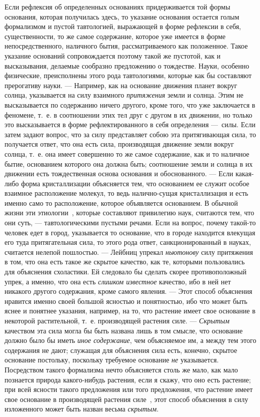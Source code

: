 Если рефлексия об определенных основаниях придерживается той формы
основания, которая получилась здесь, то указание основания остается голым
формализмом и пустой тавтологией, выражающей в форме рефлексии в себя,
существенности, то же самое содержание, которое уже имеется в форме
непосредственного, наличного бытия, рассматриваемого как положенное. Такое
указание оснований сопровождается поэтому такой же пустотой, как и
высказывания, делаемые сообразно предложению о тождестве. Науки, особенно
физические, преисполнены этого рода тавтологиями, которые как бы составляют
прерогативу науки. — Например, как на основание движения планет вокруг
солнца, указывается на силу взаимного {\em притяжения}
земли и солнца. Этим не высказывается по содержанию ничего другого, кроме
того, что уже заключается в феномене, т.~е. в соотношении этих тел друг с
другом в их движении, но только это высказывается в форме рефлектированного
в себя определения —~силы. Если затем задают вопрос, что за силу
представляет собою эта притягивающая сила, то получается ответ, что она
есть сила, производящая движение земли вокруг солнца, т.~е. она имеет
совершенно то же самое содержание, как и то наличное бытие, основанием
которого она должна быть; соотношение земли и солнца в их движении есть
тождественная основа основания и обоснованного. — Если какая-либо форма
кристаллизации объясняется тем, что основанием ее служит особое взаимное
расположение молекул, то ведь налично-сущая кристаллизация и есть именно
само то расположение, которое объявляется основанием. В обычной жизни эти
этиологии~\label{bkm:Ref474666904},
которые составляют привилегию наук, считаются тем, что они суть, —
тавтологическими пустыми речами. Если на вопрос, почему такой-то человек
едет в город, указывается то основание, что в городе находится влекущая его
туда притягательная сила, то этого рода ответ, санкционированный в науках,
считается нелепой пошлостью. — Лейбниц упрекал
{\em ньютонову} силу притяжения в том, что она есть
такое же скрытое качество, как те, которыми пользовались для объяснения
схоластики. Ей следовало бы сделать скорее противоположный упрек, а именно,
что она есть {\em слишком известное} качество, ибо в
ней нет никакого другого содержания, кроме самого явления. — Этот способ
объяснения нравится именно своей большой ясностью и понятностью, ибо что
может быть яснее и понятнее указания, например, на то, что растение имеет
свое основание в некоторой растительной, т.~е. производящей растения силе.
— {\em Скрытым} качеством эта сила могла бы быть
названа лишь в том смысле, что основание должно было бы иметь
{\em иное содержание}, чем объясняемое им, а между тем
этого содержания не дают; служащая для объяснения сила есть, конечно,
скрытое основание постольку, поскольку требуемое основание
{\em не} указывается. Посредством такого формализма
нечто объясняется столь же мало, как мало познается природа какого-нибудь
растения, если я скажу, что оно есть растение; при всей ясности такого
предложения или того предложения, что растение имеет свое основание в
производящей растения
силе~\label{bkm:Ref474666911},
этот способ объяснения в силу изложенного может быть назван весьма
{\em скрытым}.

